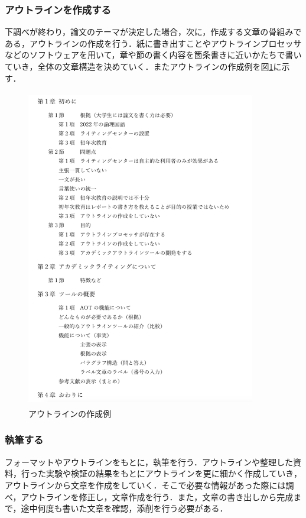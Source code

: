 \documentclass[a4j,12pt]{jarticle}
\begin{document}
\subsubsection{アウトラインを作成する}
下調べが終わり，論文のテーマが決定した場合，次に，作成する文章の骨組みである，アウトラインの作成を行う．紙に書き出すことやアウトラインプロセッサなどのソフトウェアを用いて，章や節の書く内容を箇条書きに近いかたちで書いていき，全体の文章構造を決めていく．またアウトラインの作成例を図\ref{fig:a}に示す．
\begin{figure}[h]
\begin{center}
 \includegraphics[clip,width=100mm,height=140mm]{figure/outline2.png}
\end{center}
 \caption{アウトラインの作成例}
 \label{fig:a}
\end{figure}
\newpage
\subsubsection{執筆する}
フォーマットやアウトラインをもとに，執筆を行う．アウトラインや整理した資料，行った実験や検証の結果をもとにアウトラインを更に細かく作成していき，アウトラインから文章を作成をしていく．そこで必要な情報があった際には調べ，アウトラインを修正し，文章作成を行う．また，文章の書き出しから完成まで，途中何度も書いた文章を確認，添削を行う必要がある．
\newpage
\end{document}
